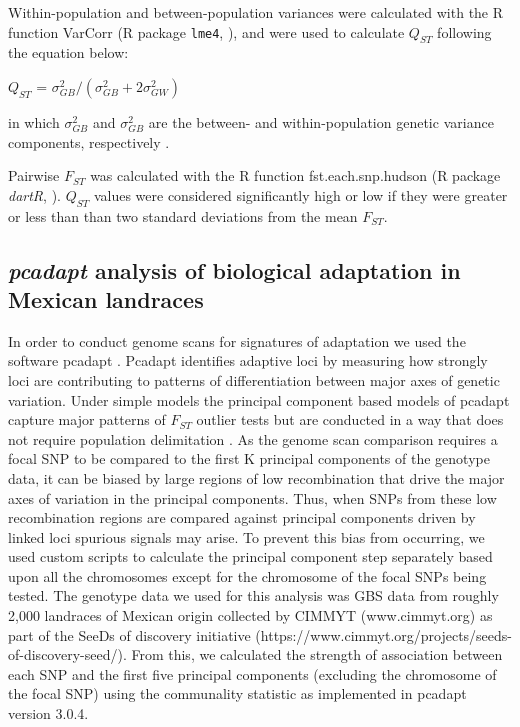 \documentclass[9pt,twocolumn,twoside,lineno]{gsajnl}
\begin{document}
Within-population and between-population variances were calculated with the R function VarCorr (R package \texttt{lme4}, \citealp{bates2014lme4}), and were used to calculate $Q_{ST}$ following the equation below:

\begin{center}
$Q_{ST}$ = \(\sigma^{2}_{GB}/(\sigma^{2}_{GB}+2\sigma^{2}_{GW})\)
\end{center}

\noindent in which $\sigma^{2}_{GB}$ and $\sigma^{2}_{GB}$ are the between- and within-population genetic variance components, respectively \citep{Leinonen2013-ic}.

Pairwise $F_{ST}$ was calculated with the R function fst.each.snp.hudson (R package \textit{dartR}, \citealp{gruber2018dartr}).
$Q_{ST}$ values were considered significantly high or low if they were greater or less than than two standard deviations from the mean $F_{ST}$.


\subsection{\textit{pcadapt} analysis of biological adaptation in Mexican landraces}

In order to conduct genome scans for signatures of adaptation we used the software pcadapt \citep{Luu2017-ws}.
Pcadapt identifies adaptive loci by measuring how strongly loci are contributing to patterns of differentiation between major axes of genetic variation.
Under simple models the principal component based models of pcadapt capture major patterns of $F_{ST}$ outlier tests but are conducted in a way that does not require population delimitation \citep{duforet2014genome}.
As the genome scan comparison requires a focal SNP to be compared to the first K principal components of the genotype data, it can be biased by large regions of low recombination that drive the major axes of variation in the principal components.
Thus, when SNPs from these low recombination regions are compared against principal components driven by linked loci spurious signals may arise.
To prevent this bias from occurring, we used custom scripts to calculate the principal component step separately based upon all the chromosomes except for the chromosome of the focal SNPs being tested.
The genotype data we used for this analysis was GBS data from roughly 2,000 landraces of Mexican origin collected by CIMMYT (www.cimmyt.org) as part of the SeeDs of discovery initiative (https://www.cimmyt.org/projects/seeds-of-discovery-seed/).
From this, we calculated the strength of association between each SNP and the first five principal components (excluding the chromosome of the focal SNP) using the communality statistic as implemented in pcadapt version 3.0.4.
\end{document}
